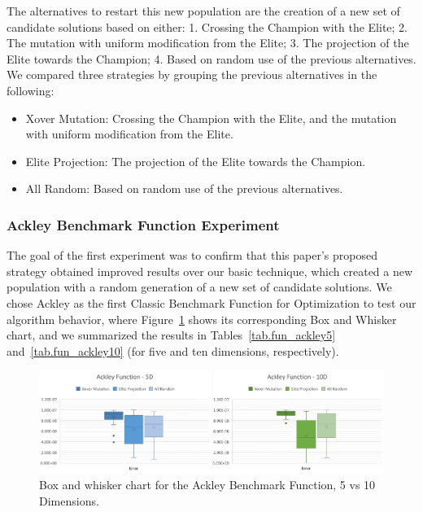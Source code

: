 \documentclass[graybox]{svmult}
\begin{document}
        The alternatives to restart this new population are the creation of a new set
        of candidate solutions based on either: 1. Crossing the Champion with the Elite;
        2. The mutation with uniform modification from the Elite; 3. The
        projection of the Elite towards the Champion; 4. Based on random use of the
        previous alternatives. We compared three strategies by grouping the previous
        alternatives in the following:

        \begin{itemize}
            \item   Xover Mutation:      Crossing the Champion with the Elite, and the mutation with uniform modification from the Elite.
            \item   Elite Projection:    The projection of the Elite towards the Champion. 
            \item   All Random:          Based on random use of the previous alternatives.
        \end{itemize}

        \subsubsection{Ackley Benchmark Function Experiment}

            The goal of the first experiment was to confirm that this paper’s
            proposed strategy obtained improved results over our basic
            technique, which created a new population with a random generation
            of a new set of candidate solutions. We chose Ackley as the first
            Classic Benchmark Function for Optimization to test our algorithm
            behavior, where Figure~\ref{fig.fun_ackley} shows its corresponding
            Box and Whisker chart, and we summarized the results in
            Tables~\ref{tab.fun_ackley5} and~\ref{tab.fun_ackley10} (for five 
            and ten dimensions, respectively).
            
            \begin{figure}
                \includegraphics[width=0.99\linewidth, frame]{img/fig_fun_ackley.pdf}
                \caption{Box and whisker chart for the Ackley Benchmark Function, 5 vs 10 Dimensions.} \label{fig.fun_ackley}
                \end{figure}
\end{document}
